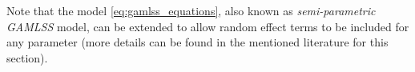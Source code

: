 Note that the model \ref{eq:gamlss_equations}, also known as \textit{semi-parametric \ac{GAMLSS}} model, can be extended to allow random effect terms to be included for any parameter (more details can be found in the mentioned literature for this section).














